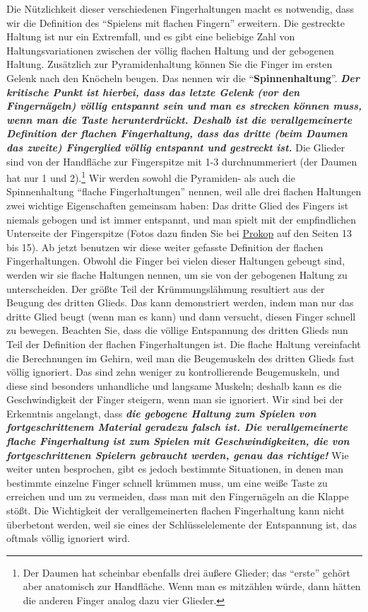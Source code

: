 Die Nützlichkeit dieser verschiedenen Fingerhaltungen macht es notwendig, dass wir die Definition des \enquote{Spielens mit flachen Fingern} erweitern.
Die gestreckte Haltung ist nur ein Extremfall, und es gibt eine beliebige Zahl von Haltungsvariationen zwischen der völlig flachen Haltung und der gebogenen Haltung.
Zusätzlich zur Pyramidenhaltung können Sie die Finger im ersten Gelenk nach den Knöcheln beugen.
Das nennen wir die \enquote{\textbf{Spinnenhaltung}}.
\textbf{\textit{Der kritische Punkt ist hierbei, dass das letzte Gelenk (vor den Fingernägeln) völlig entspannt sein und man es strecken können muss, wenn man die Taste herunterdrückt.
Deshalb ist die verallgemeinerte Definition der flachen Fingerhaltung, dass das dritte (beim Daumen das zweite) Fingerglied völlig entspannt und gestreckt ist.}}
Die Glieder sind von der Handfläche zur Fingerspitze mit 1-3 durchnummeriert (der Daumen hat nur 1 und 2).\footnote{Der Daumen hat scheinbar ebenfalls drei äußere Glieder; das \enquote{erste} gehört aber anatomisch zur Handfläche. Wenn man es mitzählen würde, dann hätten die anderen Finger analog dazu vier Glieder.}
Wir werden sowohl die Pyramiden- als auch die Spinnenhaltung \enquote{flache Fingerhaltungen} nennen, weil alle drei flachen Haltungen zwei wichtige Eigenschaften gemeinsam haben: Das dritte Glied des Fingers ist niemals gebogen und ist immer entspannt, und man spielt mit der empfindlichen Unterseite der Fingerspitze (Fotos dazu finden Sie bei \hyperref[Prokop]{Prokop} auf den Seiten 13 bis 15).
Ab jetzt benutzen wir diese weiter gefasste Definition der flachen Fingerhaltungen.
Obwohl die Finger bei vielen dieser Haltungen gebeugt sind, werden wir sie flache Haltungen nennen, um sie von der gebogenen Haltung zu unterscheiden.
Der größte Teil der Krümmungslähmung resultiert aus der Beugung des dritten Glieds.
Das kann demonstriert werden, indem man nur das dritte Glied beugt (wenn man es kann) und dann versucht, diesen Finger schnell zu bewegen.
Beachten Sie, dass die völlige Entspannung des dritten Glieds nun Teil der Definition der flachen Fingerhaltungen ist.
Die flache Haltung vereinfacht die Berechnungen im Gehirn, weil man die Beugemuskeln des dritten Glieds fast völlig ignoriert.
Das sind zehn weniger zu kontrollierende Beugemuskeln, und diese sind besonders unhandliche und langsame Muskeln; deshalb kann es die Geschwindigkeit der Finger steigern, wenn man sie ignoriert.
Wir sind bei der Erkenntnis angelangt, dass \textbf{\textit{die gebogene Haltung zum Spielen von fortgeschrittenem Material geradezu falsch ist.
Die verallgemeinerte flache Fingerhaltung ist zum Spielen mit Geschwindigkeiten, die von fortgeschrittenen Spielern gebraucht werden, genau das richtige!}}
Wie weiter unten besprochen, gibt es jedoch bestimmte Situationen, in denen man bestimmte einzelne Finger schnell krümmen muss, um eine weiße Taste zu erreichen und um zu vermeiden, dass man mit den Fingernägeln an die Klappe stößt.
Die Wichtigkeit der verallgemeinerten flachen Fingerhaltung kann nicht überbetont werden, weil sie eines der Schlüsselelemente der Entspannung ist, das oftmals völlig ignoriert wird.

